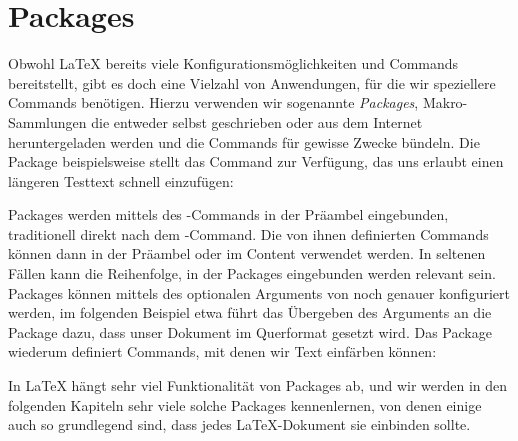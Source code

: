 \section{Packages}
Obwohl \LaTeX{} bereits viele Konfigurationsmöglichkeiten und Commands bereitstellt, gibt es doch eine Vielzahl von Anwendungen, für die wir speziellere Commands benötigen.
Hierzu verwenden wir sogenannte \emph{Packages}, Makro-Sammlungen die entweder selbst geschrieben oder aus dem Internet heruntergeladen werden und die Commands für gewisse Zwecke bündeln.
Die Package  beispielsweise stellt das Command  zur Verfügung, das uns erlaubt einen längeren Testtext schnell einzufügen:
Packages werden mittels des -Commands in der Präambel eingebunden, traditionell direkt nach dem -Command.
Die von ihnen definierten Commands können dann in der Präambel oder im Content verwendet werden.
In seltenen Fällen kann die Reihenfolge, in der Packages eingebunden werden relevant sein.
Packages können mittels des optionalen Arguments von  noch genauer konfiguriert werden, im folgenden Beispiel etwa führt das Übergeben des Arguments  an die Package  dazu, dass unser Dokument im Querformat gesetzt wird.
Das Package  wiederum definiert Commands, mit denen wir Text einfärben können:
In \LaTeX{} hängt sehr viel Funktionalität von Packages ab, und wir werden in den folgenden Kapiteln sehr viele solche Packages kennenlernen, von denen einige auch so grundlegend sind, dass jedes \LaTeX{}-Dokument sie einbinden sollte.

